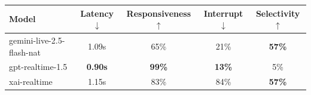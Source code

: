 \begin{tabular}{@{}lcccc@{}}
\toprule
\textbf{Model} & \textbf{Latency}$\downarrow$ & \textbf{Responsiveness}$\uparrow$ & \textbf{Interrupt}$\downarrow$ & \textbf{Selectivity}$\uparrow$ \\
\midrule
gemini-live-2.5-flash-nat & 1.09s & 65\% & 21\% & \textbf{57\%} \\
gpt-realtime-1.5 & \textbf{0.90s} & \textbf{99\%} & \textbf{13\%} & 5\% \\
xai-realtime & 1.15s & 83\% & 84\% & \textbf{57\%} \\
\bottomrule
\end{tabular}
